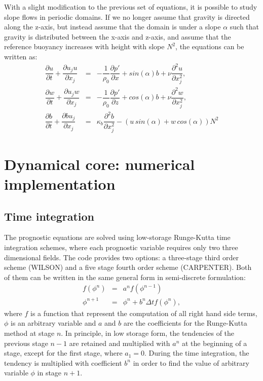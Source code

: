 \documentclass[gmd]{copernicus}
\begin{document}
With a slight modification to the previous set of equations, it is possible to study slope flows in periodic domains. If we no longer assume that gravity is directed along the z-axis, but instead assume that the domain is under a slope $\alpha$ such that gravity is distributed between the x-axis and z-axis, and assume that the reference buoyancy increases with height with slope $N^2$, the equations can be written as:
\begin{eqnarray}
\dfrac{\partial u}{\partial t} + \dfrac{\partial u_j u}{\partial x_j} & = & 
- \dfrac{1}{\rho_0}\dfrac{\partial p'}{\partial x} + sin(\alpha) b + \nu \dfrac{\partial^2 u}{\partial x_j^2}\label{eq:consuslope},\\
\dfrac{\partial w}{\partial t} + \dfrac{\partial u_j w}{\partial x_j} & = & 
- \dfrac{1}{\rho_0}\dfrac{\partial p'}{\partial z} + cos(\alpha) b + \nu \dfrac{\partial^2 w}{\partial x_j^2}\label{eq:conswslope},\\
\dfrac{\partial b}{\partial t} + \dfrac{\partial b u_j}{\partial x_j} & = & 
\kappa_b \dfrac{\partial^2 b}{\partial x_j^2} - \left (u\,sin(\alpha) + w\,cos(\alpha) \right) N^2\label{eq:consbslope}
\end{eqnarray}


\section{Dynamical core: numerical implementation}
\subsection{Time integration}
The prognostic equations are solved using low-storage Runge-Kutta time integration schemes, where each prognostic variable requires only two three dimensional fields. The code provides two options: a three-stage third order scheme (WILSON) and a five stage fourth order scheme (CARPENTER). Both of them can be written in the same general form in semi-discrete formulation:
\begin{eqnarray}
f\left(\phi^n\right) & = & a^n f\left( \phi^{n-1} \right) \\
\phi^{n+1} & = & \phi^n + b^n \Delta t f\left(\phi^n\right),
\end{eqnarray}
where $f$ is a function that represent the computation of all right hand side terms, $\phi$ is an arbitrary variable and $a$ and $b$ are the coefficients for the Runge-Kutta method at stage $n$. In principle, in low storage form, the tendencies of the previous stage $n-1$ are retained and multiplied with $a^n$ at the beginning of a stage, except for the first stage, where $a_1 = 0$. During the time integration, the tendency is multiplied with coefficient $b^n$ in order to find the value of arbitrary variable $\phi$ in stage $n+1$.
\end{document}

